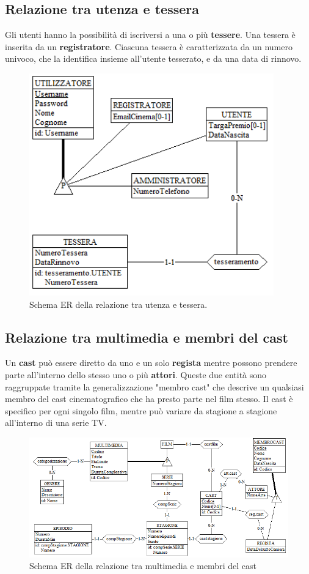 \documentclass[a4paper,12pt]{report}
\begin{document}
	\subsection{Relazione tra utenza e tessera}
	Gli utenti hanno la possibilità di iscriversi a una o più \textbf{tessere}. Una tessera è inserita da un \textbf{registratore}. Ciascuna tessera è caratterizzata da un numero univoco, che la identifica insieme all'utente tesserato, e da una data di rinnovo. 
	\begin{figure}[H]
		\centering
		\includegraphics[width=300pt]{ER/utenzatessera.png}
		\caption{Schema ER della relazione tra utenza e tessera.}
	\end{figure}
	\subsection{Relazione tra multimedia e membri del cast}
	Un \textbf{cast} può essere diretto da uno e un solo \textbf{regista} mentre possono prendere parte all'interno dello stesso uno o più \textbf{attori}. Queste due entità sono raggruppate tramite la generalizzazione "membro cast" che descrive un qualsiasi membro del cast cinematografico che ha presto parte nel film stesso. 
	Il cast è specifico per ogni singolo film, mentre può variare da stagione a stagione all'interno di una serie TV.
	\begin{figure}[H]
		\centering
		\includegraphics[width=350pt]{ER/multimediacast.png}
		\caption{Schema ER della relazione tra multimedia e membri del cast}
	\end{figure}
\end{document}
